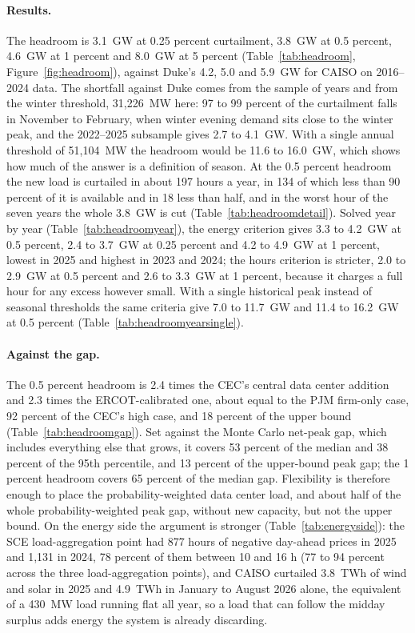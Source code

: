 \paragraph{Results.} The headroom is 3.1~GW at 0.25 percent curtailment, 3.8~GW at 0.5 percent, 4.6~GW at 1 percent and 8.0~GW at 5 percent (Table~\ref{tab:headroom}, Figure~\ref{fig:headroom}), against Duke's 4.2, 5.0 and 5.9~GW for CAISO on 2016--2024 data. The shortfall against Duke comes from the sample of years and from the winter threshold, 31,226~MW here: 97 to 99 percent of the curtailment falls in November to February, when winter evening demand sits close to the winter peak, and the 2022--2025 subsample gives 2.7 to 4.1~GW. With a single annual threshold of 51,104~MW the headroom would be 11.6 to 16.0~GW, which shows how much of the answer is a definition of season. At the 0.5 percent headroom the new load is curtailed in about 197 hours a year, in 134 of which less than 90 percent of it is available and in 18 less than half, and in the worst hour of the seven years the whole 3.8~GW is cut (Table~\ref{tab:headroomdetail}). Solved year by year (Table~\ref{tab:headroomyear}), the energy criterion gives 3.3 to 4.2~GW at 0.5 percent, 2.4 to 3.7~GW at 0.25 percent and 4.2 to 4.9~GW at 1 percent, lowest in 2025 and highest in 2023 and 2024; the hours criterion is stricter, 2.0 to 2.9~GW at 0.5 percent and 2.6 to 3.3~GW at 1 percent, because it charges a full hour for any excess however small. With a single historical peak instead of seasonal thresholds the same criteria give 7.0 to 11.7~GW and 11.4 to 16.2~GW at 0.5 percent (Table~\ref{tab:headroomyearsingle}).

\paragraph{Against the gap.} The 0.5 percent headroom is 2.4 times the CEC's central data center addition and 2.3 times the ERCOT-calibrated one, about equal to the PJM firm-only case, 92 percent of the CEC's high case, and 18 percent of the upper bound (Table~\ref{tab:headroomgap}). Set against the Monte Carlo net-peak gap, which includes everything else that grows, it covers 53 percent of the median and 38 percent of the 95th percentile, and 13 percent of the upper-bound peak gap; the 1 percent headroom covers 65 percent of the median gap. Flexibility is therefore enough to place the probability-weighted data center load, and about half of the whole probability-weighted peak gap, without new capacity, but not the upper bound. On the energy side the argument is stronger (Table~\ref{tab:energyside}): the SCE load-aggregation point had 877 hours of negative day-ahead prices in 2025 and 1,131 in 2024, 78 percent of them between 10 and 16 h (77 to 94 percent across the three load-aggregation points), and CAISO curtailed 3.8~TWh of wind and solar in 2025 and 4.9~TWh in January to August 2026 alone, the equivalent of a 430~MW load running flat all year, so a load that can follow the midday surplus adds energy the system is already discarding.

